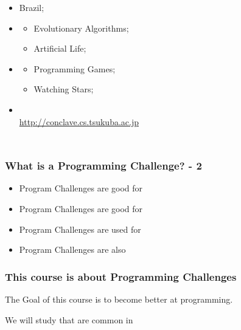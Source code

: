 \documentclass{beamer}
\begin{document}
\begin{frame}
\begin{columns}
{\begin{itemize}
      \item {} Brazil;
      \item {}
      \begin{itemize}
        \item Evolutionary Algorithms;
        \item Artificial Life;
      \end{itemize}
      \item {}
      \begin{itemize}
        \item Programming Games;
        \item Watching Stars;
      \end{itemize}
        \medskip

      \item {}\\ {\smaller \url{http://conclave.cs.tsukuba.ac.jp}}
    \end{itemize}
    }
  \end{columns}
\end{frame}

\begin{frame}
  \frametitle{What is a Programming Challenge? - 2}

  \begin{itemize}
    \item Program Challenges are good for 
    \bigskip

    \item Program Challenges are good for 
    \bigskip

    \item Program Challenges are used for 
    \bigskip

    \item Program Challenges are also 
  \end{itemize}
\end{frame}

\begin{frame}
  \frametitle{This course is about Programming Challenges}

  The Goal of this course is  to \alert{become better at programming}.

  \vfill

  We will study  that are common in
\end{frame}
\end{document}
